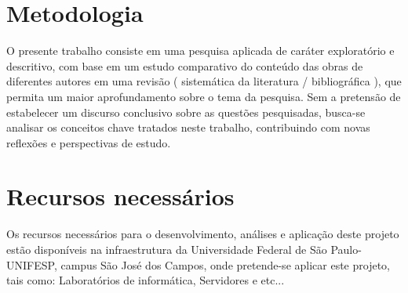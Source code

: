 \documentclass[quali]{mpit}
\begin{document}
\section{Metodologia}
O presente trabalho consiste em uma pesquisa aplicada de caráter exploratório e descritivo, com base em um estudo comparativo do conteúdo das obras de diferentes autores em uma revisão ( sistemática da literatura / bibliográfica ), que
permita um maior aprofundamento sobre o tema da pesquisa. Sem a pretensão de
estabelecer um discurso conclusivo sobre as questões pesquisadas, busca-se analisar
os conceitos chave tratados neste trabalho, contribuindo com novas reflexões e 
perspectivas de estudo.

\section{Recursos necessários}
Os recursos necessários para o desenvolvimento, análises  e aplicação deste projeto estão disponíveis na infraestrutura da Universidade Federal de São Paulo-UNIFESP, campus São José dos Campos, onde pretende-se aplicar este projeto, tais como: Laboratórios de informática, Servidores e etc...




\end{document}
